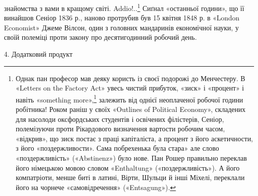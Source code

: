 \parcont{}  %
знайомства з вами в кращому світі. Addio!..\footnote{
Однак пан професор мав деяку користь із своєї подорожі до Менчестеру. В «Letters on the
Factory Act» увесь чистий прибуток, «зиск» і «процент» і навіть «something more»,\footnote*{
— щось більше. Ред,
} залежить від
однієї неоплаченої
робочої години робітника! Роком раніш у своїх «Outlines of Political Economy», складених для
насолоди оксфордських студентів і освічених філістерів, Сеніор, полемізуючи проти Рікардового
визначення вартости робочим часом, «відкрив», що зиск постає з праці капіталіста, а процент з його
аскетичности, з його «поздержливости». Сама побрехенька була стара» але слово «поздержливість»
(«Abstinenz») було нове. Пан Рошер правильно переклав його німецькою мовою словом «Enthaltung»
(«поздержливість»). А його компатріоти, менше биті в латині, Вірти, Шульци
й інші Міхелі, переклали його на чорнече «самовідречення» («Entsagung»).
} Сиґнал «останньої години», що її винайшов Сеніор 1836
р., наново протрубив був 15 квітня 1848 р. в «London Economist» Джеме Вілсон, один з головних
мандаринів економічної науки, у своїй полеміці проти
закону про десятигодинний робочий день.

4. Додатковий продукт

